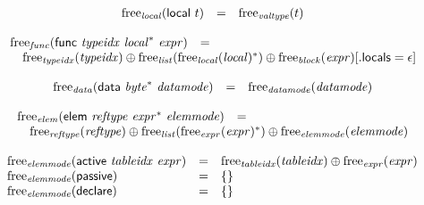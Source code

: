 $$
\begin{array}[t]{@{}lcl@{}l@{}}
{\mathrm{free}}_{\mathit{local}}(\mathsf{local}~t) & = & {\mathrm{free}}_{\mathit{valtype}}(t) \\
\end{array}
$$

$$
\begin{array}[t]{@{}lcl@{}l@{}}
{\mathrm{free}}_{\mathit{func}}(\mathsf{func}~{\mathit{typeidx}}~{{\mathit{local}}^\ast}~{\mathit{expr}}) & = & & \\
 \multicolumn{4}{@{}l@{}}{\quad
\begin{array}[t]{@{}l@{}}
{\mathrm{free}}_{\mathit{typeidx}}({\mathit{typeidx}}) \oplus {\mathrm{free}}_{\mathit{list}}({{\mathrm{free}}_{\mathit{local}}({\mathit{local}})^\ast}) \oplus {\mathrm{free}}_{\mathit{block}}({\mathit{expr}}){}[{.}\mathsf{locals} = \epsilon] \\
\end{array}
} \\
\end{array}
$$

$$
\begin{array}[t]{@{}lcl@{}l@{}}
{\mathrm{free}}_{\mathit{data}}(\mathsf{data}~{{\mathit{byte}}^\ast}~{\mathit{datamode}}) & = & {\mathrm{free}}_{\mathit{datamode}}({\mathit{datamode}}) \\
\end{array}
$$

$$
\begin{array}[t]{@{}lcl@{}l@{}}
{\mathrm{free}}_{\mathit{elem}}(\mathsf{elem}~{\mathit{reftype}}~{{\mathit{expr}}^\ast}~{\mathit{elemmode}}) & = & & \\
 \multicolumn{4}{@{}l@{}}{\quad
\begin{array}[t]{@{}l@{}}
{\mathrm{free}}_{\mathit{reftype}}({\mathit{reftype}}) \oplus {\mathrm{free}}_{\mathit{list}}({{\mathrm{free}}_{\mathit{expr}}({\mathit{expr}})^\ast}) \oplus {\mathrm{free}}_{\mathit{elemmode}}({\mathit{elemmode}}) \\
\end{array}
} \\
\end{array}
$$

$$
\begin{array}[t]{@{}lcl@{}l@{}}
{\mathrm{free}}_{\mathit{elemmode}}(\mathsf{active}~{\mathit{tableidx}}~{\mathit{expr}}) & = & {\mathrm{free}}_{\mathit{tableidx}}({\mathit{tableidx}}) \oplus {\mathrm{free}}_{\mathit{expr}}({\mathit{expr}}) \\
{\mathrm{free}}_{\mathit{elemmode}}(\mathsf{passive}) & = & \{  \} \\
{\mathrm{free}}_{\mathit{elemmode}}(\mathsf{declare}) & = & \{  \} \\
\end{array}
$$

